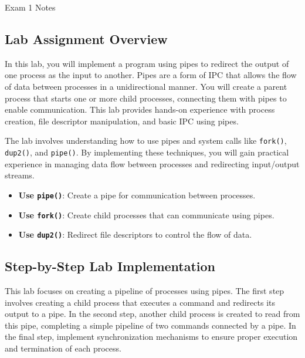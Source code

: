 \begin{examnotes}{Exam 1 Notes}
    \subsection*{Lab Assignment Overview}
    
    In this lab, you will implement a program using pipes to redirect the output of one process as the input to another. Pipes are a form of IPC that allows the flow of data between processes in a 
    unidirectional manner. You will create a parent process that starts one or more child processes, connecting them with pipes to enable communication. This lab provides hands-on experience with process 
    creation, file descriptor manipulation, and basic IPC using pipes.
    
    \begin{highlight}
        The lab involves understanding how to use pipes and system calls like \texttt{fork()}, \texttt{dup2()}, and \texttt{pipe()}. By implementing these techniques, you will gain practical experience 
        in managing data flow between processes and redirecting input/output streams.
        \begin{itemize}
            \item \textbf{Use \texttt{pipe()}}: Create a pipe for communication between processes.
            \item \textbf{Use \texttt{fork()}}: Create child processes that can communicate using pipes.
            \item \textbf{Use \texttt{dup2()}}: Redirect file descriptors to control the flow of data.
        \end{itemize}
    \end{highlight}
    
    \subsection*{Step-by-Step Lab Implementation}
    
    This lab focuses on creating a pipeline of processes using pipes. The first step involves creating a child process that executes a command and redirects its output to a pipe. In the second step, 
    another child process is created to read from this pipe, completing a simple pipeline of two commands connected by a pipe. In the final step, implement synchronization mechanisms to ensure proper 
    execution and termination of each process.
    

\end{examnotes}

